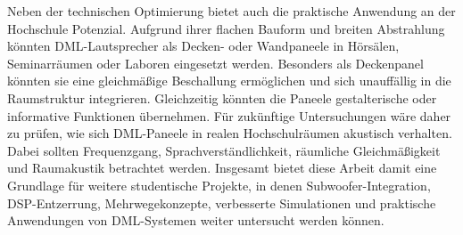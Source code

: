 Neben der technischen Optimierung bietet auch die praktische Anwendung an der Hochschule Potenzial. Aufgrund ihrer flachen Bauform und breiten Abstrahlung könnten DML-Lautsprecher als Decken- oder Wandpaneele in Hörsälen, Seminarräumen oder Laboren eingesetzt werden. Besonders als Deckenpanel könnten sie eine gleichmäßige Beschallung ermöglichen und sich unauffällig in die Raumstruktur integrieren. Gleichzeitig könnten die Paneele gestalterische oder informative Funktionen übernehmen.
Für zukünftige Untersuchungen wäre daher zu prüfen, wie sich DML-Paneele in realen Hochschulräumen akustisch verhalten. Dabei sollten Frequenzgang, Sprachverständlichkeit, räumliche Gleichmäßigkeit und Raumakustik betrachtet werden. Insgesamt bietet diese Arbeit damit eine Grundlage für weitere studentische Projekte, in denen Subwoofer-Integration, DSP-Entzerrung, Mehrwegekonzepte, verbesserte Simulationen und praktische Anwendungen von DML-Systemen weiter untersucht werden können.
